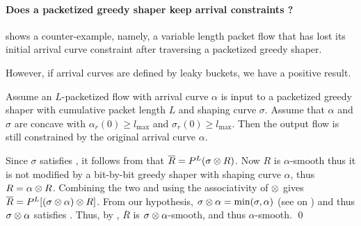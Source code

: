
\paragraph{Does a packetized greedy shaper keep arrival constraints ?}

 shows a counter-example, namely, a variable
length packet flow that has lost its initial arrival curve
constraint after traversing a packetized greedy shaper.

\begin{figure}[!htbp]
\end{figure}


However, if arrival curves are defined by leaky buckets, we have a
positive result.

\begin{theorem}
Assume an $L$-packetized flow with arrival curve $\alpha$ is input
to a packetized greedy shaper with cumulative packet length $L$
and shaping curve $\sigma$. Assume that $\alpha$ and $\sigma$ are
concave with $\alpha_r(0) \geq l_{\max}$ and $\sigma_r(0) \geq
l_{\max}$. Then the output flow is still constrained by the
original arrival curve $\alpha$.
\end{theorem}
 \pr
 Since $\sigma$
 satisfies , it follows from
  that
 $
 \overline{R} = P^L(\sigma \otimes R)$.
Now $R$ is $\alpha$-smooth thus it is not modified by a bit-by-bit
greedy shaper with shaping curve $\alpha$, thus
    $R= \alpha \otimes R$.
Combining the two and using the associativity of $\otimes$ gives
    $
    \overline{R}=
     P^L [(\sigma \otimes \alpha) \otimes
    R]$.
From our hypothesis, $\sigma \otimes \alpha= \min(\sigma, \alpha) $
(see  on )
    and thus $\sigma \otimes \alpha$ satisfies
    . Thus, by , $\overline{R}$ is
    $\sigma \otimes \alpha$-smooth, and thus $\alpha$-smooth.
    \qed

